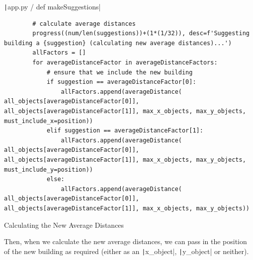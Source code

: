 \documentclass[12pt]{report}
\newcommand{\pil}[1]{\protect\texttt|#1|}
\begin{document}
\begin{listing}[H]
\pil{app.py / def makeSuggestions}
\begin{verbatim}
        # calculate average distances
        progress((num/len(suggestions))+(1*(1/32)), desc=f'Suggesting building a {suggestion} (calculating new average distances)...')
        allFactors = []
        for averageDistanceFactor in averageDistanceFactors:
            # ensure that we include the new building
            if suggestion == averageDistanceFactor[0]:
                allFactors.append(averageDistance( all_objects[averageDistanceFactor[0]], all_objects[averageDistanceFactor[1]], max_x_objects, max_y_objects, must_include_x=position))
            elif suggestion == averageDistanceFactor[1]:
                allFactors.append(averageDistance( all_objects[averageDistanceFactor[0]], all_objects[averageDistanceFactor[1]], max_x_objects, max_y_objects, must_include_y=position))
            else:
                allFactors.append(averageDistance( all_objects[averageDistanceFactor[0]], all_objects[averageDistanceFactor[1]], max_x_objects, max_y_objects))
\end{verbatim}
\caption{Calculating the New Average Distances}\label{cs:newAverageDistances}
\end{listing}

Then, when we calculate the new average distances, we can pass in the position of the new building as required (either as an \pil{x_object}, \pil{y_object} or neither).

\begin{center}
\end{center}
\end{document}
